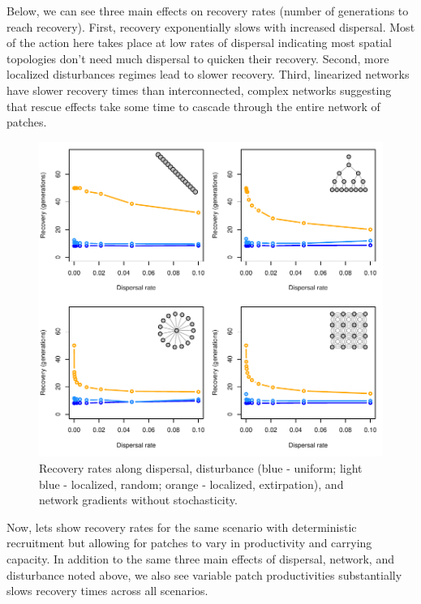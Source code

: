 \documentclass[]{article}
\begin{document}
Below, we can see three main effects on recovery rates (number of
generations to reach recovery). First, recovery exponentially slows with
increased dispersal. Most of the action here takes place at low rates of
dispersal indicating most spatial topologies don't need much dispersal
to quicken their recovery. Second, more localized disturbances regimes
lead to slower recovery. Third, linearized networks have slower recovery
times than interconnected, complex networks suggesting that rescue
effects take some time to cascade through the entire network of patches.

\begin{figure}[H]

{\centering \includegraphics{Managing_for_ecological_surprises_in_metapopulations_makeHTML_files/figure-latex/general results-1} 

}

\caption{Recovery rates along dispersal, disturbance (blue - uniform; light blue - localized, random; orange - localized, extirpation), and network gradients without stochasticity.}\label{fig:general results}
\end{figure}

 Now, lets show recovery rates for the same scenario with deterministic
recruitment but allowing for patches to vary in productivity and
carrying capacity. In addition to the same three main effects of
dispersal, network, and disturbance noted above, we also see variable
patch productivities substantially slows recovery times across all
scenarios.
\end{document}
